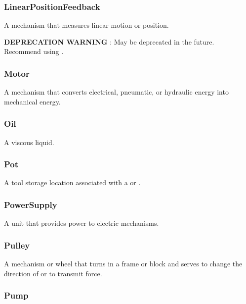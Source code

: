 \subsubsection{LinearPositionFeedback}
\label{sec:LinearPositionFeedback}



A mechanism that measures linear motion or position.

\textbf{DEPRECATION WARNING} : May be deprecated in the future. Recommend using .


\subsubsection{Motor}
\label{sec:Motor}



A mechanism that converts electrical, pneumatic, or hydraulic energy into mechanical energy.


\subsubsection{Oil}
\label{sec:Oil}



A viscous liquid.


\subsubsection{Pot}
\label{sec:Pot}



A tool storage location associated with a  or .


\subsubsection{PowerSupply}
\label{sec:PowerSupply}



A unit that provides power to electric mechanisms.


\subsubsection{Pulley}
\label{sec:Pulley}



A mechanism or wheel that turns in a frame or block and serves to change the direction of or to transmit force.


\subsubsection{Pump}
\label{sec:Pump}



